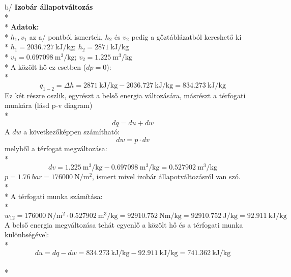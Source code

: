  

 b/ \textbf{Izobár állapotváltozás}\\*
 \\*
 \textbf{Adatok:} \\*
 \vspace{5mm}
 $h_1, v_1$ az a/ pontból ismertek, $h_2$ és $v_2$ pedig a gőztáblázatból kereshető ki \\*
 $h_1={\SI{2036,727}{\kJ\per\kilogram}}$; \quad $h_2 = {\SI{2871}{\kJ\per\kilogram }}$   \\*
 $v_1={\SI{0,697098}{\meter\cubed\per\kilogram}}$; \quad $v_2 = {\SI{1,225}{\meter\cubed\per\kilogram}}$	\\*
 \noindent
 A közölt hő ez esetben ($dp=0$):	\\*
 \begin{equation}
 q_{1-2}=\Delta h={\SI{2871}{\kJ\per\kilogram}}-{\SI{2036,727}{\kJ\per\kilogram}}={\SI{834,273}{\kJ\per\kilogram}}
 \end{equation}
 \noindent
 Ez két részre oszlik, egyrészt a belső energia változására, másrészt a térfogati munkára (lásd p-v diagram)	\\*
 \begin{equation*}
 	dq=du+dw
 \end{equation*}	
 A $dw$ a következőképpen számítható:
 \begin{equation*}
 	dw=p\cdot dv
 \end{equation*}
melyből a térfogat megváltozása: \\*
 \begin{equation}
 dv={\SI{1,225}{\meter\cubed\per\kilogram}}-{\SI{0,697098}{\meter\cubed\per\kilogram}}={\SI{0,527902}{\meter\cubed\per\kilogram}}
 \end{equation}
 $p={\SI{1,76}{bar}}={\SI{176000}{\newton\per\meter\squared}}$, ismert mivel izobár állapotváltozásról van szó.  \\*
 \\*
 A térfogati munka számítása: \\*
 \begin{equation} 
 w_{12}={\SI{176000}{\newton\per\meter\squared}}\cdot {\SI{0,527902}{\meter\cubed\per\kilogram}}={\SI{92910,752}{\newton\meter\per\kilogram}}={\SI{92910,752}{\joule\per\kilogram}}={\SI{92,911}{\kJ\per\kilogram}}
 \end{equation} 
 A belső energia megváltozása tehát egyenlő a közölt hő és a térfogati munka különbségével: \\*
 \begin{equation}
 du=dq-dw={\SI{834,273}{\kJ\per\kilogram}}-{\SI{92,911}{\kJ\per\kilogram}}={\SI{741,362}{\kJ\per\kilogram}}
 \end{equation}
\\* 

